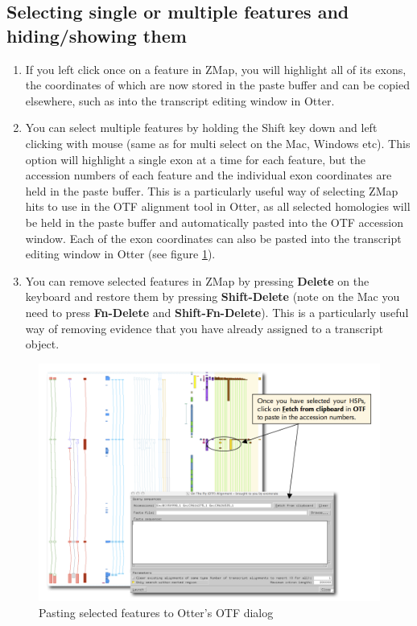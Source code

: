 \documentclass[letterpaper]{article}
\begin{document}
\subsection{Selecting single or multiple features and hiding/showing them}
\begin{enumerate}
\item If you left click once on a feature in ZMap, you will highlight all of its exons, the coordinates of which are now stored in the paste buffer and can be copied elsewhere, such as into the transcript editing window in Otter.
\item You can select multiple features by holding the Shift key down and left clicking with mouse (same as for multi select on the Mac, Windows etc). This option will highlight a single exon at a time for each feature, but the accession numbers of each feature and the individual exon coordinates are held in the paste buffer. This is a particularly useful way of selecting ZMap hits to use in the OTF alignment tool in Otter, as all selected homologies will be held in the paste buffer and automatically pasted into the OTF accession window. Each of the exon coordinates can also be pasted into the transcript editing window in Otter (see figure \ref{img_show_hide}).
\item You can remove selected features in ZMap by pressing \textbf{Delete} on the keyboard and restore them by pressing \textbf{Shift-Delete} (note on the Mac you need to press \textbf{Fn-Delete} and \textbf{Shift-Fn-Delete}). This is a particularly useful way of removing evidence that you have already assigned to a transcript object.
\end{enumerate}


\begin{figure}
\centering
\color[rgb]{0.30980393,0.5058824,0.7411765}
\includegraphics[width=15.231cm]{img_show_hide.png}
\caption{Pasting selected features to Otter's OTF dialog}
\label{img_show_hide}
\end{figure}
\end{document}
